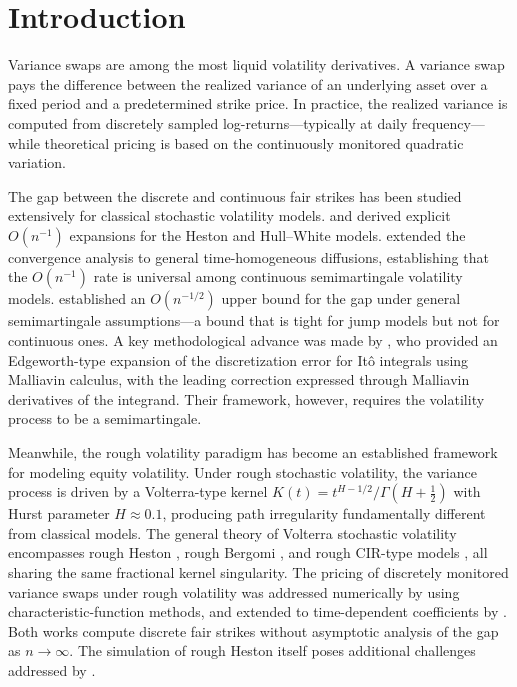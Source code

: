 \documentclass[12pt]{article}
\theoremstyle{definition}
\begin{document}
\section{Introduction}\label{sec:intro}

Variance swaps are among the most liquid volatility derivatives.
A variance swap pays the difference between the realized variance
of an underlying asset over a fixed period and a predetermined
strike price. In practice, the realized variance is computed from
discretely sampled log-returns---typically at daily frequency---while
theoretical pricing is based on the continuously monitored quadratic
variation.

The gap between the discrete and continuous fair strikes has been
studied extensively for classical stochastic volatility models.
\citet{BroadieJain2008} and \citet{BernardCui2014} derived explicit
$O(n^{-1})$ expansions for the Heston and Hull--White models.
\citet{BernardCuiMcLeish2014} extended the convergence analysis to
general time-homogeneous diffusions, establishing that the
$O(n^{-1})$ rate is universal among continuous semimartingale
volatility models.
\citet{JarrowKchiaProtte2013} established an $O(n^{-1/2})$ upper
bound for the gap under general semimartingale assumptions---a bound
that is tight for jump models but not for continuous ones.
A key methodological advance was made by
\citet{AlosFukasawa2021}, who provided an Edgeworth-type expansion of
the discretization error for It\^o integrals using Malliavin calculus,
with the leading correction expressed through Malliavin derivatives
of the integrand. Their framework, however, requires the volatility
process to be a semimartingale.

Meanwhile, the rough volatility paradigm
\citep{GatheralJaissonRosenbaum2018,ElEuchRosenbaum2019}
has become an established framework for modeling equity volatility.
Under rough stochastic volatility, the variance process is driven by a
Volterra-type kernel $K(t) = t^{H-1/2}/\Gamma(H+\tfrac12)$ with Hurst
parameter $H \approx 0.1$, producing path irregularity fundamentally
different from classical models.
The general theory of Volterra stochastic volatility encompasses
rough Heston \citep{ElEuchRosenbaum2019}, rough Bergomi
\citep{BayerFrizGatheral2016}, and rough CIR-type models
\citep{AbiJaberLarssonPulido2021}, all sharing the same fractional
kernel singularity.
The pricing of discretely monitored variance swaps under rough
volatility was addressed numerically by
\citet{XiWong2021} using characteristic-function methods, and
extended to time-dependent coefficients by \citet{ZhuangHuang2025}.
Both works compute discrete fair strikes without asymptotic analysis
of the gap as $n \to \infty$. The simulation of rough Heston itself
poses additional challenges addressed by \citet{RichardTanYang2023}.
\end{document}
